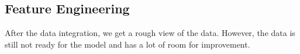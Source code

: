 \documentclass[8pt]{article}
\begin{document}


\subsection{Feature Engineering}
After the data integration, we get a rough view of the data. However, the data is still not ready for the model and has a lot of room for improvement.
\end{document}
